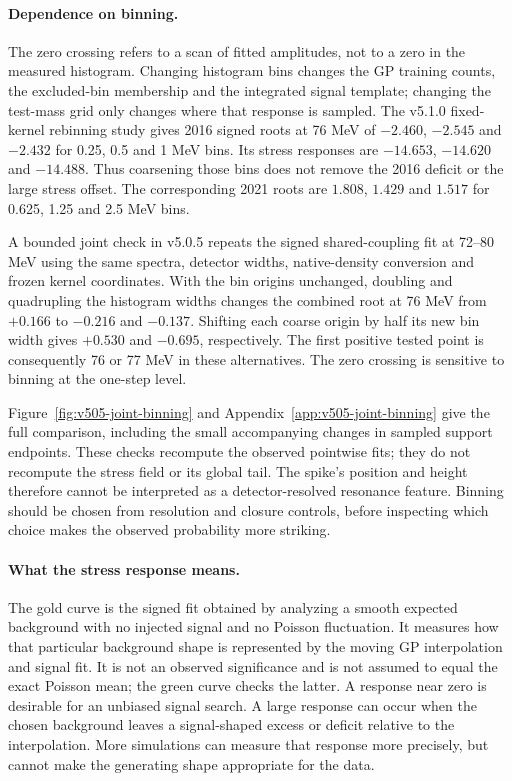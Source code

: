 \paragraph{Dependence on binning.}
The zero crossing refers to a scan of fitted amplitudes, not to a zero in
the measured histogram. Changing histogram bins changes the GP training
counts, the excluded-bin membership and the integrated signal template;
changing the test-mass grid only changes where that response is sampled.
The v5.1.0 fixed-kernel rebinning study gives 2016 signed roots at 76 MeV of
$-2.460$, $-2.545$ and $-2.432$ for 0.25, 0.5 and 1 MeV bins. Its stress
responses are $-14.653$, $-14.620$ and $-14.488$. Thus coarsening those bins
does not remove the 2016 deficit or the large stress offset. The corresponding
2021 roots are $1.808$, $1.429$ and $1.517$ for 0.625, 1.25 and 2.5 MeV bins.

A bounded joint check in v5.0.5 repeats the signed shared-coupling fit at
72--80 MeV using the same spectra, detector widths, native-density conversion
and frozen kernel coordinates. With the bin origins unchanged, doubling
and quadrupling the histogram widths changes the combined root at 76 MeV
from $+0.166$ to $-0.216$ and $-0.137$. Shifting each coarse origin by half
its new bin width gives $+0.530$ and $-0.695$, respectively. The first
positive tested point is consequently 76 or 77 MeV in these alternatives.
The zero crossing is sensitive to binning at the one-step level.

Figure~\ref{fig:v505-joint-binning} and
Appendix~\ref{app:v505-joint-binning} give the full comparison, including
the small accompanying changes in sampled support endpoints. These checks
recompute the observed pointwise fits; they do not recompute the stress
field or its global tail. The spike's position and height therefore cannot
be interpreted as a detector-resolved resonance feature. Binning should be
chosen from resolution and closure controls, before inspecting which choice
makes the observed probability more striking.

\paragraph{What the stress response means.}
The gold curve is the signed fit obtained by analyzing a smooth expected
background with no injected signal and no Poisson fluctuation. It measures
how that particular background shape is represented by the moving GP
interpolation and signal fit. It is not an observed significance and is not
assumed to equal the exact Poisson mean; the green curve checks the latter.
A response near zero is desirable for an unbiased signal search. A large
response can occur when the chosen background leaves a signal-shaped excess
or deficit relative to the interpolation. More simulations can measure that
response more precisely, but cannot make the generating shape appropriate
for the data.

